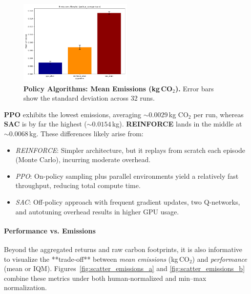 \begin{figure}[htbp]
	\centering
	\includegraphics[width=0.5\textwidth]{figures/policy_comparison/barplot_emissions_policy_comparison.png}
	\caption{\textbf{Policy Algorithms: Mean Emissions (kg\,CO$_2$).} Error bars show the standard deviation across 32 runs.}
	\label{fig:policy_emissions_bar}
\end{figure}

\noindent
\textbf{PPO} exhibits the lowest emissions, averaging $\sim0.0029$\,kg CO$_2$ per run, whereas \textbf{SAC} is by far the highest ($\sim0.0154$\,kg). \textbf{REINFORCE} lands in the middle at $\sim0.0068$\,kg. These differences likely arise from:
\begin{itemize}
	\item \emph{REINFORCE}: Simpler architecture, but it replays from scratch each episode (Monte Carlo), incurring moderate overhead.  
	\item \emph{PPO}: On-policy sampling plus parallel environments yield a relatively fast throughput, reducing total compute time.  
	\item \emph{SAC}: Off-policy approach with frequent gradient updates, two Q-networks, and autotuning overhead results in higher GPU usage.
\end{itemize}



\paragraph{Performance vs. Emissions}
Beyond the aggregated returns and raw carbon footprints, it is also informative to visualize the **trade‐off** between \emph{mean emissions} (kg\,CO$_2$) and \emph{performance} (mean or IQM). Figures~\ref{fig:scatter_emissions_a} and \ref{fig:scatter_emissions_b} combine these metrics under both human‐normalized and min–max normalization.

